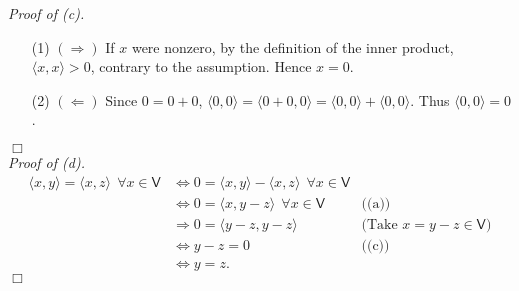\documentclass{article}
\begin{document}
\emph{Proof of (c).}
\begin{enumerate}
\item[(1)]
$(\Longrightarrow)$
If $x$ were nonzero, by the definition of the inner product,
$\langle x, x \rangle > 0$, contrary to the assumption.
Hence $x = 0$.
\item[(2)]
$(\Longleftarrow)$
Since $0 = 0+0$,
$\langle 0,0 \rangle = \langle 0+0,0 \rangle = \langle 0,0 \rangle + \langle 0,0 \rangle.$
Thus $\langle 0,0 \rangle = 0$.
\end{enumerate}
$\Box$ \\

\emph{Proof of (d).}
\begin{align*}
  \langle x,y \rangle = \langle x,z \rangle \:\: \forall x \in \mathsf{V}
  &\Longleftrightarrow
  0 = \langle x,y \rangle - \langle x,z \rangle \:\: \forall x \in \mathsf{V} \\
  &\Longleftrightarrow
  0 = \langle x,y-z \rangle \:\: \forall x \in \mathsf{V}
    &\text{((a))} \\
  &\Longrightarrow
  0 = \langle y-z,y-z \rangle
    &\text{(Take $x=y-z \in \mathsf{V}$)} \\
  &\Longleftrightarrow
  y-z = 0
    &\text{((c))} \\
  &\Longleftrightarrow
  y = z.
\end{align*}
$\Box$ \\\\
\end{document}
